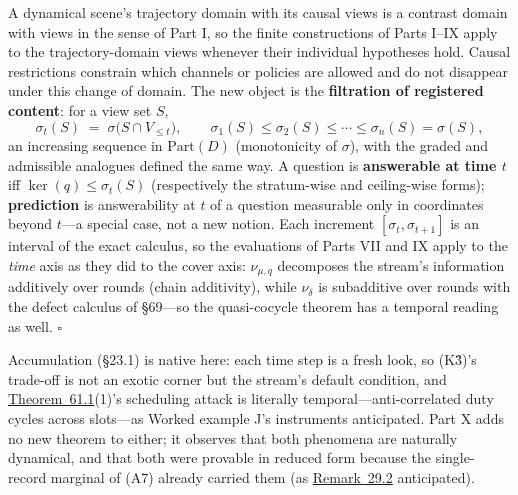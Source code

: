 \begin{thmplain}

A dynamical scene's trajectory domain with its causal views is a contrast domain with views in the sense of Part I, so the finite constructions of Parts I--IX apply to the trajectory-domain views whenever their individual hypotheses hold. Causal restrictions constrain which channels or policies are allowed and do not disappear under this change of domain. The new object is the \textbf{filtration of registered content}: for a view set \(S\),
\[
\sigma_t(S) \;=\; \sigma\big(S \cap V_{\le t}\big), \qquad \sigma_1(S) \le \sigma_2(S) \le \cdots \le \sigma_n(S) = \sigma(S),
\]
an increasing sequence in \(\mathrm{Part}(D)\) (monotonicity of \(\sigma\)), with the graded and admissible analogues defined the same way. A question is \textbf{answerable at time \(t\)} iff \(\ker(q) \le \sigma_t(S)\) (respectively the stratum-wise and ceiling-wise forms); \textbf{prediction} is answerability at \(t\) of a question measurable only in coordinates beyond \(t\)---\hspace{0pt}a special case, not a new notion. Each increment \([\sigma_t, \sigma_{t+1}]\) is an interval of the exact calculus, so the evaluations of Parts VII and IX apply to the \emph{time} axis as they did to the cover axis: \(\nu_{\mu,q}\) decomposes the stream's information additively over rounds (chain additivity), while \(\nu_\delta\) is subadditive over rounds with the defect calculus of §69---\hspace{0pt}so the quasi-cocycle theorem has a temporal reading as well. \(\square\)
\end{thmplain}

\begin{thmrem}

Accumulation (§23.1) is native here: each time step is a fresh look, so (K3̂)'s trade-off is not an exotic corner but the stream's default condition, and \hyperlink{stmt:61.1}{Theorem~61.1}(1)'s scheduling attack is literally temporal---\hspace{0pt}anti-correlated duty cycles across slots---\hspace{0pt}as Worked example J's instruments anticipated. Part X adds no new theorem to either; it observes that both phenomena are naturally dynamical, and that both were provable in reduced form because the single-record marginal of (A7) already carried them (as \hyperlink{stmt:29.2}{Remark~29.2} anticipated).
\end{thmrem}

